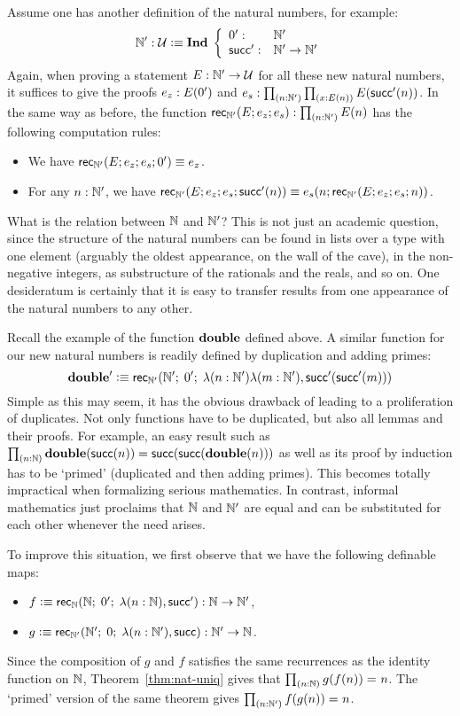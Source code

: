 Assume one has another definition of the natural numbers, for example:
\[  \mathbb{N}' : \mathcal{U} \vcentcolon\equiv \mathbf{Ind \;} \left\{
\begin{array}{ll}
0' : & \mathbb{N}' \\
\mathsf{succ}' : & \mathbb{N}' \to \mathbb{N}'
\end{array}
\right. \]
Again, when proving a statement $E : \mathbb{N}' \to \mathcal{U}$ for all these new natural numbers, it suffices to give the proofs $e_z : E(0')$ and $e_s : \prd{n : \natp}{x : E(n)} E(\Sp(n))$. In the same way as before, the function $\rec\natp(E;e_z;e_s) : \prd{n:\natp} E(n)$
has the following computation rules:
\begin{itemize}
\item We have $\mathsf{rec}_{\mathbb{N}'}(E;e_z;e_s;0') \equiv e_z$.
\item For any $n : \mathbb{N}'$, we have $\mathsf{rec}_{\mathbb{N}'}(E;e_z;e_s;\mathsf{succ}'(n)) \equiv e_s(n;\mathsf{rec}_{\mathbb{N}'}(E;e_z;e_s;n))$.
\end{itemize}
What is the relation between $\mathbb{N}$ and $\mathbb{N}'$?
This is not just an academic question, since the structure of the natural numbers
can be found in lists over a type with one element (arguably the oldest appearance,
on the wall of the cave), in the non-negative integers, as substructure of the
rationals and the reals, and so on. One desideratum is certainly that it is easy to
transfer results from one appearance of the natural numbers to any other.

Recall the example of the function $\mathbf{double}$ defined above. A similar function
for our new natural numbers is readily defined by duplication and adding primes:
\[ \mathbf{double'} \vcentcolon\equiv \mathsf{rec}_{\mathbb{N}'}(\mathbb{N}'; \; 0'; \;  \lambda(n: \mathbb{N}') \lambda (m:\mathbb{N}'), \mathsf{succ}'(\mathsf{succ}'(m))) \]
Simple as this may seem, it has the obvious drawback of leading to a
proliferation of duplicates. Not only functions have to be
duplicated, but also all lemmas and their proofs. For example,
an easy result such as  $\prd{n : \nat} \dbl(\s(n))=\s(\s(\dbl(n)))$ as well
as its proof by induction has to be `primed' (duplicated and then adding primes).
This becomes totally impractical when formalizing serious mathematics.
In contrast, informal mathematics just proclaims that $\mathbb{N}$ and $\mathbb{N}'$ are
equal and can be substituted for each other whenever the need arises.

To improve this situation, we first observe that we have the following definable maps:
\begin{itemize}
\item $f \vcentcolon\equiv \mathsf{rec}_{\mathbb{N}}(\mathbb{N}; \; 0'; \;  \lambda(n: \mathbb{N}), \mathsf{succ}')
       : \mathbb{N} \to\mathbb{N}'$,
\item $g \vcentcolon\equiv \mathsf{rec}_{\mathbb{N}'}(\mathbb{N}'; \; 0; \;  \lambda(n: \mathbb{N}'), \mathsf{succ})
       : \mathbb{N}' \to\mathbb{N}$.
\end{itemize}
Since the composition of $g$ and $f$ satisfies the same recurrences as the identity function on $\mathbb{N}$, Theorem~\ref{thm:nat-uniq} gives that $\prd{n : \nat} \id{g(f(n))}{n}$. The `primed' version of the same theorem gives $\prd{n : \natp} \id{f(g(n))}{n}$.

